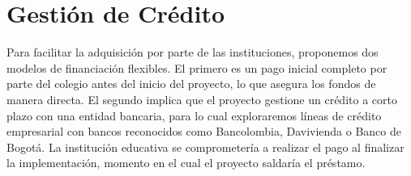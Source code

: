 \section{Gestión de Crédito}
Para facilitar la adquisición por parte de las instituciones, proponemos dos
modelos de financiación flexibles. El primero es un pago inicial completo por
parte del colegio antes del inicio del proyecto, lo que asegura los fondos de
manera directa. El segundo implica que el proyecto gestione un crédito a corto
plazo con una entidad bancaria, para lo cual exploraremos líneas de crédito
empresarial con bancos reconocidos como Bancolombia, Davivienda o Banco de
Bogotá. La institución educativa se comprometería a realizar el pago al
finalizar la implementación, momento en el cual el proyecto saldaría el
préstamo.
